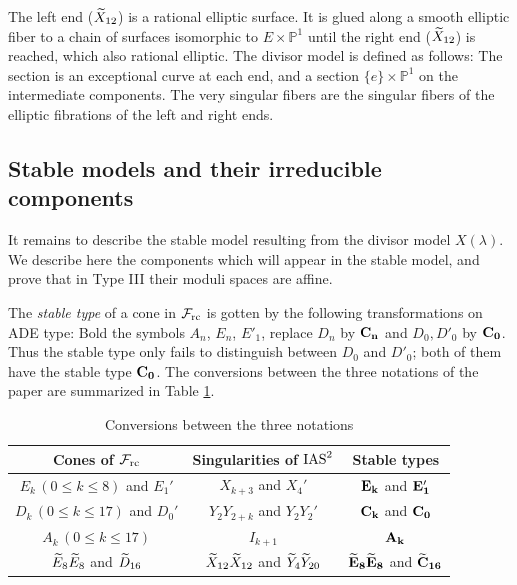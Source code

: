 \documentclass[table,x11names]{amsart}
\begin{document}
The left end (${\widetilde X}_{12}$) is a rational elliptic surface. It is glued along a smooth elliptic fiber
to a chain of surfaces isomorphic to $E\times \mathbb{P}^1$ until the right end (${\widetilde X}_{12}$)
is reached, which also rational elliptic. The divisor model is defined as follows:
The section is an exceptional curve at each end, and a section $\{e\}\times \mathbb{P}^1$ on the
intermediate components. The very singular fibers are the singular fibers of the 
elliptic fibrations of the left and right ends.

\subsection{Stable models and their irreducible components}
\label{sec:irr-comps}

It remains to describe the stable model resulting from the divisor model $X(\lambda)$.
We describe here the components which will appear in the stable model,
and prove that in Type III their moduli spaces are affine. 

\begin{definition}\label{stabletype} 
  The {\it stable type} of a cone in ${\mathcal F}_{\rm rc}$ is gotten by the
  following transformations on ADE type:
  Bold the symbols $A_n$, $E_n$, $E'_1$, replace $D_n$ by ${\bf C_n}$ and
  $D_0,D'_0$ by ${\bf C_0}$. Thus the stable type only fails to distinguish
  between $D_0$ and $D'_0$; both of them have the stable type ${\bf C_0}$. 
   The conversions between the three notations of the paper
  are summarized in Table \ref{tab:notation-conversions}.
  \end{definition}


\begin{table}

  \begin{tabular}[htp]{ c | c |  c  }
Cones of ${\mathcal F}_{\rm rc}$ & Singularities of $\operatorname{IAS}^2$ & Stable types   \\
    \hline
$E_k\,(0\leq k\leq 8)$ and $E_1'$ & $X_{k+3}$ and $X_4'$ & ${\bf E_k}$ and ${\bf E_1'}$  \\
$D_k\,(0\leq k\leq 17)$ and $D_0'$  & $Y_2Y_{2+k}$ and $Y_2Y_2'$ & ${\bf C_k}$ and ${\bf C_0}$ \\
$A_k\,(0\leq k\leq 17)$  & $I_{k+1}$ & ${\bf A_k}$ \\
${\widetilde E}_8{\widetilde E}_8$ and ${\widetilde D}_{16}$  & ${\widetilde X}_{12}{\widetilde X}_{12}$ and ${\widetilde Y}_{4}{\widetilde Y}_{20}$ & ${\bf {\widetilde E}_8{\widetilde E}_8}$ and ${\bf {\widetilde C}_{16}}$
    \end{tabular}
    \bigskip
    \caption{Conversions between the three notations}
    \label{tab:notation-conversions}
\end{table} 
\end{document}
